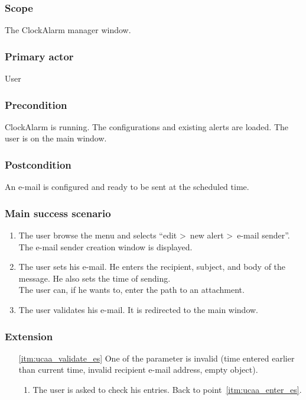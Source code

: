 \subsubsection{Scope}
The ClockAlarm manager window.
\subsubsection{Primary actor}
User
\subsubsection{Precondition}
ClockAlarm is running. The configurations and existing alerts are loaded. The user is on the main window.
\subsubsection{Postcondition}
An e-mail is configured and ready to be sent at the scheduled time.
\subsubsection{Main success scenario}
\begin{enumerate}
    \item The user browse the menu and selects ``edit \textgreater~new alert \textgreater~e-mail sender''. The e-mail sender creation window is displayed. 
	\item\label{itm:ucaa_enter_es} The user sets his e-mail. He enters the recipient, subject, and body of the message. He also sets the time of sending. \\The user can, if he wants to, enter the path to an attachment.
	\item\label{itm:ucaa_validate_es} The user validates his e-mail. It is redirected to the main window.
\end{enumerate}
\subsubsection{Extension}
\begin{enumerate}
	\item[\ref{itm:ucaa_validate_es}] One of the parameter is invalid (time entered earlier than current time, invalid recipient e-mail address, empty object).
	\begin{enumerate}[i]
		\item The user is asked to check his entries. Back to point~\ref{itm:ucaa_enter_es}.
	\end{enumerate}
\end{enumerate}
